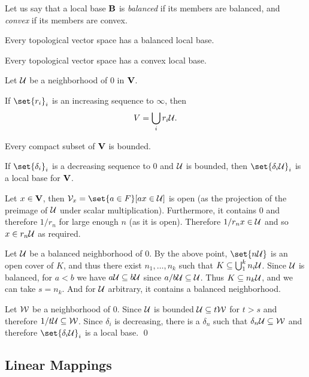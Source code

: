 \eproof

Let us say that a local base ${\bf B}$ is {\it balanced\/} if its members are balanced, and {\it convex\/} if its members are convex.

\bcoro

    \benum
        \item Every topological vector space has a balanced local base.
        \item Every topological vector space has a convex local base.
    \eenum

\ecoro

\bthrm

    Let ${\cal U}$ be a neighborhood of $0$ in ${\bf V}$.
    \benum
        \item If $\set{r_i}_i$ is an increasing sequence to $\infty$, then
        $$ V = \bigcup_i r_i{\cal U} . $$
        \item Every compact subset of ${\bf V}$ is bounded.
        \item If $\set{\delta_i}_i$ is a decreasing sequence to $0$ and ${\cal U}$ is bounded, then $\set{\delta_i\U}_i$ is a local base for ${\bf V}$.
    \eenum

\ethrm

\bproof

    \benum
        \item Let $x\in{\bf V}$, then $\V_x=\set{a\in F}[ax\in\U]$ is open (as the projection of the preimage of ${\cal U}$ under scalar multiplication).
        Furthermore, it contains $0$ and therefore $1/r_n$ for large enough $n$ (as it is open).
        Therefore $1/r_nx\in{\cal U}$ and so $x\in r_n{\cal U}$ as required.
        \item Let ${\cal U}$ be a balanced neighborhood of $0$.
        By the above point, $\set{n\U}$ is an open cover of $K$, and thus there exist $n_1,\dots,n_k$ such that $K\subseteq\bigcup_1^k n_i{\cal U}$.
        Since ${\cal U}$ is balanced, for $a<b$ we have $a{\cal U}\subseteq b{\cal U}$ since $a/b{\cal U}\subseteq{\cal U}$.
        Thus $K\subseteq n_k{\cal U}$, and we can take $s=n_k$.
        And for ${\cal U}$ arbitrary, it contains a balanced neighborhood.
        \item Let ${\cal W}$ be a neighborhood of $0$.
        Since ${\cal U}$ is bounded ${\cal U}\subseteq t{\cal W}$ for $t>s$ and therefore $1/t{\cal U}\subseteq{\cal W}$.
        Since $\delta_i$ is decreasing, there is a $\delta_n$ such that $\delta_n{\cal U}\subseteq{\cal W}$ and therefore $\set{\delta_i\U}_i$ is a local base.
        \qed
    \eenum

\eproof

\subsection{Linear Mappings}

